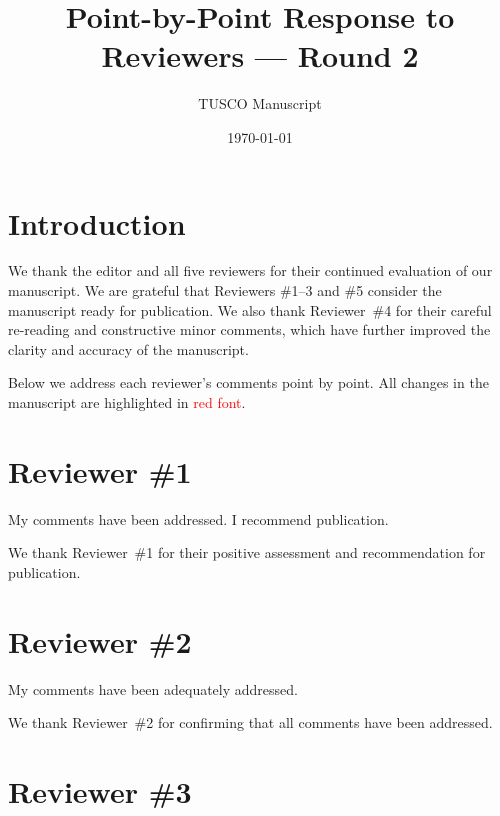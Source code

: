 \documentclass[11pt]{article}
\title{\textbf{Point-by-Point Response to Reviewers --- Round 2}}
\author{TUSCO Manuscript}
\date{\today}
\begin{document}
\maketitle

\tableofcontents
\newpage

\section*{Introduction}

We thank the editor and all five reviewers for their continued evaluation of our manuscript. We are grateful that Reviewers \#1--3 and \#5 consider the manuscript ready for publication. We also thank Reviewer~\#4 for their careful re-reading and constructive minor comments, which have further improved the clarity and accuracy of the manuscript.

Below we address each reviewer's comments point by point. All changes in the manuscript are highlighted in \textcolor{red}{red font}.

\newpage

\section{Reviewer \#1}

\begin{positiveremarks}
My comments have been addressed. I recommend publication.
\end{positiveremarks}

\begin{responseboxnew}
We thank Reviewer~\#1 for their positive assessment and recommendation for publication.
\end{responseboxnew}

\section{Reviewer \#2}

\begin{positiveremarks}
My comments have been adequately addressed.
\end{positiveremarks}

\begin{responseboxnew}
We thank Reviewer~\#2 for confirming that all comments have been addressed.
\end{responseboxnew}

\section{Reviewer \#3}
\end{document}
